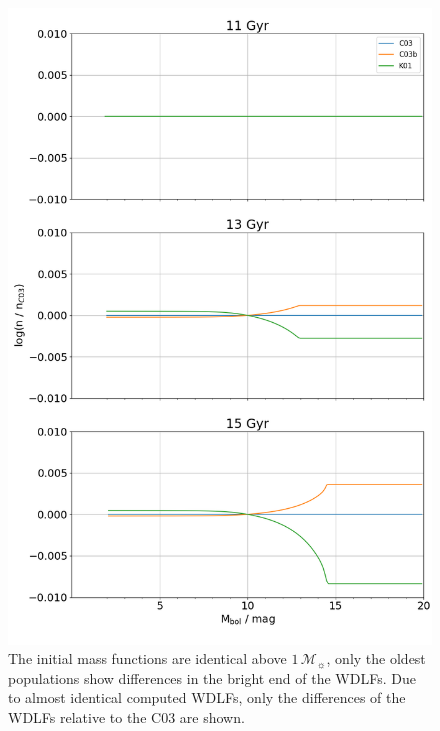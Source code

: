 \documentclass[fleqn,usenatbib]{rasti}
\newcommand{\msun}{\mathcal{M}_{\sun}}
\begin{document}
\begin{figure}
    \centering
    \includegraphics[width=0.8\columnwidth]{fig_09_wdlf_compare_imf.png}
    \caption{The initial mass functions are identical above $1\,\msun$, only the
    oldest populations show differences in the bright end of the WDLFs. Due to
    almost identical computed WDLFs, only the differences of the WDLFs
    relative to the C03 are shown.}
    \label{fig:wdlf_compare_imf}
\end{figure}
\end{document}
